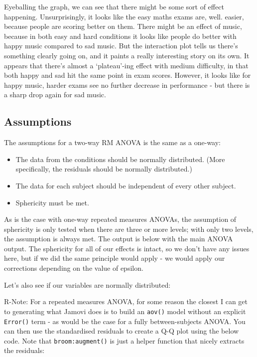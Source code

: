 \documentclass[
]{book}
\begin{document}
Eyeballing the graph, we can see that there might be some sort of effect happening. Unsurprisingly, it looks like the easy maths exams are, well. easier, because people are scoring better on them. There might be an effect of music, because in both easy and hard conditions it looks like people do better with happy music compared to sad music. But the interaction plot tells us there's something clearly going on, and it paints a really interesting story on its own. It appears that there's almost a `plateau'-ing effect with medium difficulty, in that both happy and sad hit the same point in exam scores. However, it looks like for happy music, harder exams see no further decrease in performance - but there is a sharp drop again for sad music.

\hypertarget{assumptions-1}{%
\subsection{Assumptions}\label{assumptions-1}}

The assumptions for a two-way RM ANOVA is the same as a one-way:

\begin{itemize}
\item
  The data from the conditions should be normally distributed. (More specifically, the residuals should be normally distributed.)
\item
  The data for each subject should be independent of every other subject.
\item
  Sphericity must be met.
\end{itemize}

As is the case with one-way repeated measures ANOVAs, the assumption of sphericity is only tested when there are three or more levels; with only two levels, the assumption is always met. The output is below with the main ANOVA output. The sphericity for all of our effects is intact, so we don't have any issues here, but if we did the same principle would apply - we would apply our corrections depending on the value of epsilon.

Let's also see if our variables are normally distributed:

R-Note: For a repeated measures ANOVA, for some reason the closest I can get to generating what Jamovi does is to build an \texttt{aov()} model without an explicit \texttt{Error()} term - as would be the case for a fully between-subjects ANOVA. You can then use the standardised residuals to create a Q-Q plot using the below code. Note that \texttt{broom:augment()} is just a helper function that nicely extracts the residuals:
\end{document}
